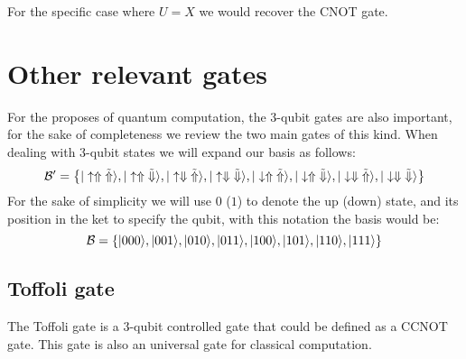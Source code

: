 For the specific case where $U=X$ we would recover the CNOT gate.


\section{Other relevant gates}
For the proposes of quantum computation, the 3-qubit gates are also important, for the sake of completeness  we review the two main gates of this kind. When dealing with 3-qubit states we will expand our basis as follows:
\begin{equation}
  \mathcal{B}'=\left\{|\uparrow\Uparrow\tilde{\Uparrow}\rangle,
                     |\uparrow\Uparrow\tilde{\Downarrow}\rangle,
                     |\uparrow\Downarrow\tilde{\Uparrow}\rangle,
                     |\uparrow\Downarrow\tilde{\Downarrow}\rangle,
                     |\downarrow\Uparrow\tilde{\Uparrow}\rangle,
                     |\downarrow\Uparrow\tilde{\Downarrow}\rangle,
                     |\downarrow\Downarrow\tilde{\Uparrow}\rangle,
                     |\downarrow\Downarrow\tilde{\Downarrow}\rangle
              \right\}
\end{equation}
For the sake of simplicity we will use $0$ ($1$) to denote the up (down) state, and its position in the ket to specify the qubit, with this notation the basis would be:
\begin{equation}
  \mathcal{B}=\left\{|000\rangle,|001\rangle,|010\rangle,|011\rangle,
                     |100\rangle,|101\rangle,|110\rangle,|111\rangle\right\}
\end{equation}

\subsection{Toffoli gate}
The Toffoli gate is a 3-qubit controlled gate that could be defined as a CCNOT gate. This gate is also an universal gate for classical computation.

